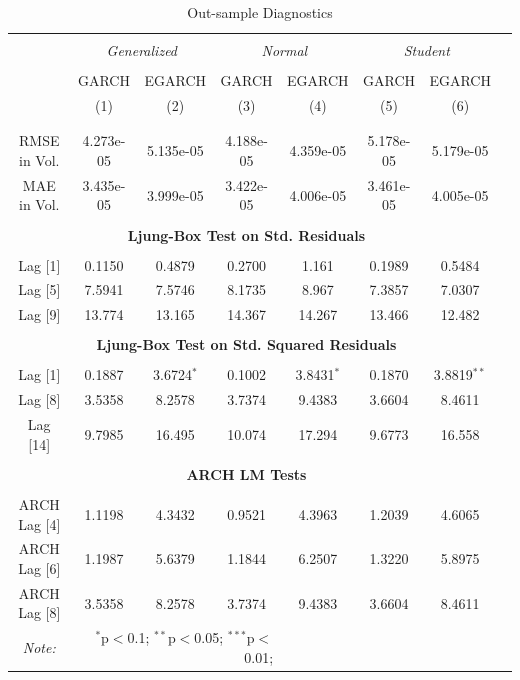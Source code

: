 \documentclass[a4paper]{article}
\begin{document}
\begin{table}[H] \centering 
  \caption{Out-sample Diagnostics} 
  \label{tab:diagnostic-out} %
\begin{tabular}{@{\extracolsep{5pt}}cccccccc} 
\\[-1.8ex]\hline 
\hline \\[-1.8ex] 
 & \multicolumn{2}{c}{\textit{Generalized}} & \multicolumn{2}{c}{\textit{Normal}} & \multicolumn{2}{c}{\textit{Student}} \\ 
\cline{2-7} 
\\[-1.8ex] & GARCH & EGARCH & GARCH & EGARCH & GARCH & EGARCH \\ 
& (1) & (2) & (3) & (4) & (5) & (6) \\ 

\\[-1.8ex]\hline
\\[-1.8ex] RMSE in Vol. & 4.273e-05 & 5.135e-05 & 4.188e-05 & 4.359e-05 & 5.178e-05 & 5.179e-05 \\ 
MAE in Vol. & 3.435e-05 & 3.999e-05 & 3.422e-05 & 4.006e-05 & 3.461e-05 & 4.005e-05\\ 
\hline \\[-1.8ex] 

& \multicolumn{5}{c}{\textbf{Ljung-Box Test on Std. Residuals}}\\
\hline \\[-1.8ex] 
Lag [1] & 0.1150 & 0.4879 & 0.2700 & 1.161 & 0.1989 & 0.5484\\ 
Lag [5] & 7.5941 & 7.5746 & 8.1735 & 8.967 & 7.3857 & 7.0307\\ 
Lag [9] & 13.774 & 13.165 & 14.367 & 14.267& 13.466 & 12.482\\  
\hline \\[-1.8ex] 

& \multicolumn{5}{c}{\textbf{Ljung-Box Test on Std. Squared Residuals}}\\
\hline \\[-1.8ex] 
Lag [1] & 0.1887 & 3.6724$^{*}$ & 0.1002& 3.8431$^{*}$ & 0.1870 & 3.8819$^{**}$\\ 
Lag [8] & 3.5358 & 8.2578 & 3.7374 & 9.4383 & 3.6604 & 8.4611\\ 
Lag [14] & 9.7985 & 16.495 & 10.074 & 17.294 & 9.6773 & 16.558\\
\hline \\[-1.8ex]

& \multicolumn{5}{c}{\textbf{ARCH LM Tests}}\\
\hline \\[-1.8ex] 
ARCH Lag [4] & 1.1198 & 4.3432 & 0.9521 & 4.3963 & 1.2039 & 4.6065\\ 
ARCH Lag [6] & 1.1987 & 5.6379 & 1.1844 & 6.2507 & 1.3220 & 5.8975\\ 
ARCH Lag [8] & 3.5358 & 8.2578 & 3.7374 & 9.4383 & 3.6604 & 8.4611\\

\hline 
\textit{Note:}  & \multicolumn{3}{r}{$^{*}$p$<$0.1; $^{**}$p$<$0.05; $^{***}$p$<$0.01;} \\ 
\end{tabular} 
\end{table} 
\end{document}
